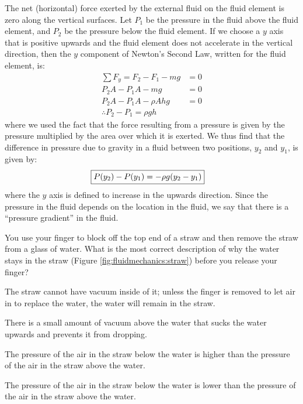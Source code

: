 The net (horizontal) force exerted by the external fluid on the fluid element is zero along the vertical surfaces. Let $P_1$ be the pressure in the fluid above the fluid element, and $P_2$ be the pressure below the fluid element. If we choose a $y$ axis that is positive upwards and the fluid element does not accelerate in the vertical direction, then the $y$ component of Newton's Second Law, written for the fluid element, is:
\begin{align*}
\sum F_y = F_2 - F_1 -mg &= 0\\
P_2A - P_1A-mg &=0\\
P_2A - P_1A-\rho Ahg &=0\\
\therefore P_2 - P_1 = \rho gh
\end{align*}
where we used the fact that the force resulting from a pressure is given by the pressure multiplied by the area over which it is exerted. We thus find that the difference in pressure due to gravity in a fluid between two positions, $y_2$ and $y_1$, is given by:
\begin{align}
\label{eq:fluidmechanics:pgrav}
\Aboxed{P(y_2) - P(y_1) = -\rho g (y_2 - y_1)}
\end{align}
where the $y$ axis is defined to increase in the upwards direction. Since the pressure in the fluid depends on the location in the fluid, we say that there is a ``pressure gradient'' in the fluid.
\begin{checkpoint}
\begin{MCquestion}{You use your finger to block off the top end of a straw and then remove the straw from a glass of water. What is the most correct description of why the water stays in the straw (Figure \ref{fig:fluidmechanics:straw}) before you release your finger?}
\item The straw cannot have vacuum inside of it; unless the finger is removed to let air in to replace the water, the water will remain in the straw.
\item There is a small amount of vacuum above the water that sucks the water upwards and prevents it from dropping. 
\item The pressure of the air in the straw below the water is higher than the pressure of the air in the straw above the water. \correct
\item The pressure of the air in the straw below the water is lower than the pressure of the air in the straw above the water.
\end{MCquestion}
\end{checkpoint}

